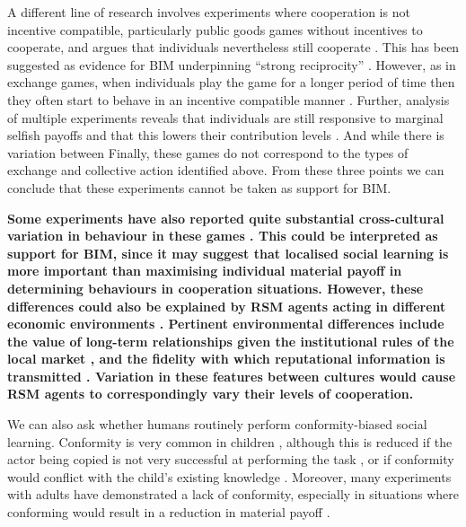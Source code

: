 \documentclass[10pt, a4paper, fleqn]{article}
\begin{document}
A different line of research involves experiments where cooperation is not incentive compatible, particularly public goods games without incentives to cooperate, and argues that individuals nevertheless still cooperate \citep{Fehr:2002:b}. This has been suggested as evidence for BIM underpinning ``strong reciprocity'' \citep{Fehr:2002:a,Boyd:2003:a}. However, as in exchange games, when individuals play the game for a longer period of time then they often start to behave in an incentive compatible manner \citep{Binmore:2005:b,Sefton:2007:a}. Further, analysis of multiple experiments reveals that individuals are still responsive to marginal selfish payoffs and that this lowers their contribution levels \citep{Ledyard:1995:a,Thomas:2016:a}. And while there is variation between Finally, these games do not correspond to the types of exchange and collective action identified above. From these three points we can conclude that these experiments cannot be taken as support for BIM.

\textbf{Some experiments have also reported quite substantial cross-cultural variation in behaviour in these games \citep{Henrich:2006:aa,Herrmann:2008:a,Gerkey:2013:a}. This could be interpreted as support for BIM, since it may suggest that localised social learning is more important than maximising individual material payoff in determining behaviours in cooperation situations. However, these differences could also be explained by RSM agents acting in different economic environments \citep{Baumard:2013:a}. Pertinent environmental differences include the value of long-term relationships given the institutional rules of the local market \citep{North:1990:a}, and the fidelity with which reputational information is transmitted \citep{Delton:2010:a,Greif:2006:a}. Variation in these features between cultures would cause RSM agents to correspondingly vary their levels of cooperation.} 

We can also ask whether humans routinely perform conformity-biased social learning. Conformity is very common in children \citep{Haun:2014:a}, although this is reduced if the actor being copied is not very successful at performing the task \citep{Scofield:2013:a,Schillaci:2014:a}, or if conformity would conflict with the child's existing knowledge \citep{Sobel:2013:a}. Moreover, many experiments with adults have demonstrated a lack of conformity, especially in situations where conforming would result in a reduction in material payoff \citep{Lamba:2011:a,Lamba:2014:a,Burton-Chellew:2015:a,Burton-Chellew:2017:a}. 
\end{document}
